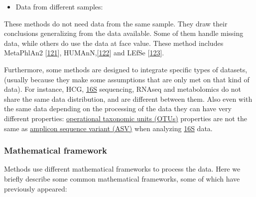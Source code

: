 \documentclass[
  12pt,
  a4paper,
  twoside,
  openright]{book}
\providecommand{\tightlist}{%
  \setlength{\itemsep}{0pt}\setlength{\parskip}{0pt}}
\begin{document}
\begin{itemize}
\tightlist
\item
  Data from different samples:
\end{itemize}

These methods do not need data from the same sample.
They draw their conclusions generalizing from the data available.
Some of them handle missing data, while others do use the data at face value.
These method includes MetaPhlAn2 {[}\protect\hyperlink{ref-franzosaSpecieslevelFunctionalProfiling2018}{121}{]}, HUMAnN,{[}\protect\hyperlink{ref-truongMetaPhlAn2EnhancedMetagenomic2015}{122}{]} and LEfSe {[}\protect\hyperlink{ref-segataMetagenomicBiomarkerDiscovery2011}{123}{]}.

Furthermore, some methods are designed to integrate specific types of datasets, (usually because they make some assumptions that are only met on that kind of data).
For instance, HCG, \protect\hyperlink{acronyms_16S}{16S} sequencing, RNAseq and metabolomics do not share the same data distribution, and are different between them.
Also even with the same data depending on the processing of the data they can have very different properties: \protect\hyperlink{acronyms_OTUs}{operational taxonomic units (OTUs)} properties are not the same as \protect\hyperlink{acronyms_ASV}{amplicon sequence variant (ASV)} when analyzing \protect\hyperlink{acronyms_16S}{16S} data.

\hypertarget{mathematical-framework}{%
\subsubsection{Mathematical framework}\label{mathematical-framework}}

Methods use different mathematical frameworks to process the data.
Here we briefly describe some common mathematical frameworks, some of which have previously appeared:
\end{document}
